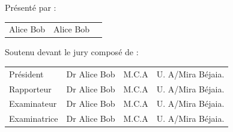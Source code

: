 \begin{titlepage}
\vspace{1.2cm}



\begin{center}
	
	Présenté par :\\\medskip
	
	
	\begin{tabular}{lcr}
		Alice Bob & Alice Bob
	\end{tabular}
	
\end{center}




\begin{center}
	Soutenu devant le jury composé de :\\\bigskip 
\end{center}
 \begin{tabular}{p{3.5cm}p{4.5cm}p{2.5cm}p{4cm}}
 	Président  & Dr Alice Bob & M.C.A &  U. A/Mira Béjaia.  \\
 	Rapporteur   &  Dr Alice Bob & M.C.A &  U. A/Mira Béjaia.  \\
 	Examinateur  &  Dr Alice Bob & M.C.A &  U. A/Mira Béjaia.  \\
 	Examinatrice   &  Dr Alice Bob & M.C.A &  U.  A/Mira Béjaia.\\
 \end{tabular}

\vspace{0.7cm}

\vfill

\begin{center}
\end{center}

\end{titlepage}
